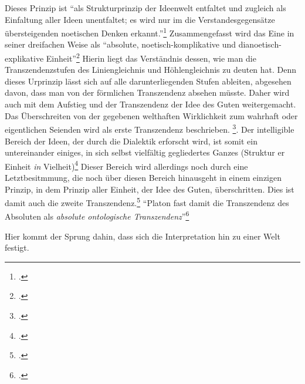 Dieses Prinzip ist \enquote{als Strukturprinzip der Ideenwelt entfaltet und zugleich als Einfaltung aller Ideen unentfaltet; es wird nur im die Verstandesgegensätze übersteigenden noetischen Denken erkannt.}\footcite[vgl.][S. 190]{halfwassenaufstieg2006}
Zusammengefasst wird das Eine in seiner dreifachen Weise als \enquote{absolute, noetisch-komplikative und dianoetisch-explikative Einheit}\footcite[][S. 190]{halfwassenaufstieg2006}
Hierin liegt das Verständnis dessen, wie man die Transzendenzstufen des Liniengleichnis und Höhlengleichnis zu deuten hat. Denn dieses Urprinzip lässt sich auf alle darunterliegenden Stufen ableiten, abgesehen davon, dass man von der förmlichen Transzendenz absehen müsste. 
Daher wird auch mit dem Aufstieg und der Transzendenz der Idee des Guten weitergemacht.
Das Überschreiten von der gegebenen welthaften Wirklichkeit zum wahrhaft oder eigentlichen Seienden wird als erste Transzendenz beschrieben. \footcite[vgl.][S. 222]{halfwassenaufstieg2006}.
Der intelligible Bereich der Ideen, der durch die Dialektik erforscht wird, ist somit ein untereinander einiges, in sich selbst vielfältig gegliedertes Ganzes (Struktur er Einheit \emph{in} Vielheit)\footcite[vgl.][S. 223]{halfwassenaufstieg2006} Dieser Bereich wird allerdings noch durch eine Letztbesitmmung, die noch über diesen Bereich hinausgeht in einem einzigen Prinzip, in dem Prinzip aller Einheit, der Idee des Guten, überschritten. Dies ist damit auch die zweite Transzendenz.\footcite[vgl.][S. 223f.]{halfwassenaufstieg2006}
\enquote{Platon fast damit die Transzendenz des Absoluten als \emph{absolute ontologische Transzendenz}}\footcite[][S. 224]{halfwassenaufstieg2006}

Hier kommt der Sprung dahin, dass sich die Interpretation hin zu einer Welt festigt. 

